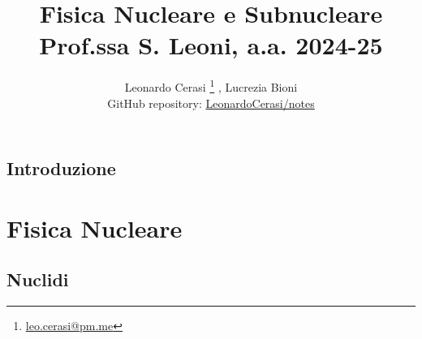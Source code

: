 \documentclass[a4paper, 12pt, openany]{book}
\author{Leonardo Cerasi%
	\thanks{\scriptsize\href{mailto:leonardo.cerasi@studenti.unimi.it}{leo.cerasi@pm.me}}%
	, Lucrezia Bioni\\
	\small GitHub repository: \href{https://github.com/LeonardoCerasi/notes}{LeonardoCerasi/notes}}
\title{\Huge\textbf{Fisica Nucleare e Subnucleare} \\ \large Prof.ssa S. Leoni, a.a. 2024-25}
\begin{document}
\frontmatter

\maketitle
\tableofcontents

\mainmatter

\chapter*{Introduzione}


\part{Fisica Nucleare}

\chapter{Nuclidi}
\end{document}
